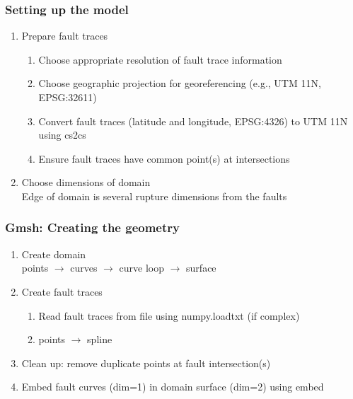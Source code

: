 \documentclass[aspectratio=169]{beamer}
\begin{document}
\begin{frame}
  \frametitle{Setting up the model}
  \summary{}
  
  \begin{enumerate}
  \item Prepare fault traces
    \begin{enumerate}
    \item Choose appropriate resolution of fault trace information
    \item Choose geographic projection for georeferencing (e.g., UTM 11N, {\ttfamily EPSG:32611})
    \item Convert fault traces (latitude and longitude, {\ttfamily EPSG:4326}) to UTM 11N using {\ttfamily cs2cs}
    \item Ensure fault traces have common point(s) at intersections
    \end{enumerate}\pause
  \item Choose dimensions of domain \\
    Edge of domain is several rupture dimensions from the faults
  \end{enumerate}
  
\end{frame}


\begin{frame}
  \frametitle{Gmsh: Creating the geometry}
  \summary{}
  
  \begin{enumerate}
  \item Create domain\\
    points $\rightarrow$ curves $\rightarrow$ curve loop $\rightarrow$ surface\pause
  \item Create fault traces
    \begin{enumerate}
    \item Read fault traces from file using {\ttfamily numpy.loadtxt} (if complex)
    \item points $\rightarrow$ spline
    \end{enumerate}\pause
  \item Clean up: remove duplicate points at fault intersection(s)\pause
  \item Embed fault curves (dim=1) in domain surface (dim=2) using {\ttfamily embed}
  \end{enumerate}
  
\end{frame}
\end{document}
